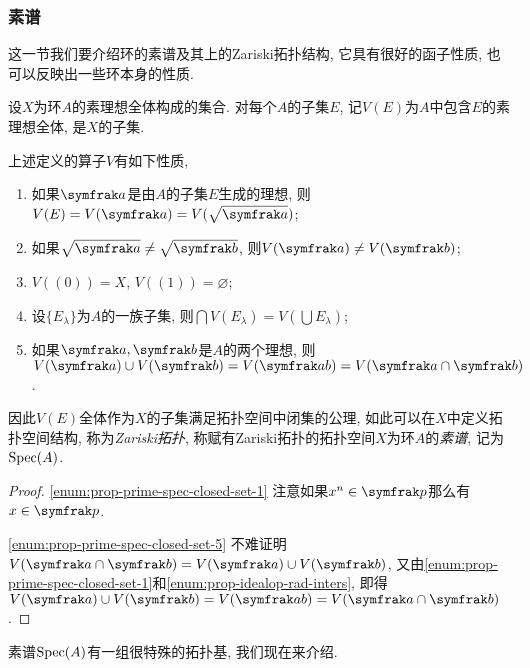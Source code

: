 \subsubsection{素谱}\label{sec:algebra-primespec}

这一节我们要介绍环的素谱及其上的Zariski拓扑结构, 它具有很好的函子性质, 也可以反映出一些环本身的性质.

设$X$为环$A$的素理想全体构成的集合. 对每个$A$的子集$E$, 记$V(E)$为$A$中包含$E$的素理想全体, 是$X$的子集.

\begin{proposition}\label{prop:primespecclosedset}
  上述定义的算子$V$有如下性质,
  \begin{enumerate}
    \item\label{enum:prop-prime-spec-closed-set-1} 如果$\ideal{a}$是由$A$的子集$E$生成的理想, 则$V(E)=V(\ideal{a})=V(\sqrt{\ideal{a}})$;
    \item\label{enum:prop-prime-spec-closed-set-2} 如果$\sqrt{\ideal{a}}\neq\sqrt{\ideal{b}}$, 则$V(\ideal{a})\neq V(\ideal{b})$;
    \item\label{enum:prop-prime-spec-closed-set-3} $V((0))=X$, $V((1))=\varnothing$;
    \item\label{enum:prop-prime-spec-closed-set-4} 设$\{E_\lambda\}$为$A$的一族子集, 则$\bigcap V(E_\lambda)=V(\bigcup E_\lambda)$;
    \item\label{enum:prop-prime-spec-closed-set-5} 如果$\ideal{a}, \ideal{b}$是$A$的两个理想, 则$V(\ideal{a})\cup V(\ideal{b})=V(\ideal{ab})= V(\ideal{a}\cap \ideal{b})$.
  \end{enumerate}
  因此$V(E)$全体作为$X$的子集满足拓扑空间中闭集的公理, 如此可以在$X$中定义拓扑空间结构, 称为\emph{Zariski拓扑}, 称赋有Zariski拓扑的拓扑空间$X$为环$A$的\emph{素谱}, 记为$\operatorname{Spec} (A)$.
\end{proposition}

\begin{proof}
  \ref{enum:prop-prime-spec-closed-set-1} 注意如果$x^n\in \ideal{p}$那么有$x\in\ideal{p}$.

  \ref{enum:prop-prime-spec-closed-set-5} 不难证明$V(\ideal{a}\cap\ideal{b})=V(\ideal{a})\cup V(\ideal{b})$, 又由\ref{enum:prop-prime-spec-closed-set-1}和\ref{enum:prop-idealop-rad-inters}, 即得$V(\ideal{a})\cup V(\ideal{b})=V(\ideal{ab})= V(\ideal{a}\cap \ideal{b})$.
\end{proof}

素谱$\operatorname{Spec} (A)$有一组很特殊的拓扑基, 我们现在来介绍.

